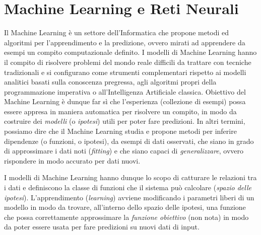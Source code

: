 \section{Machine Learning e Reti Neurali}\label{sec:intro:MLeNN}
Il Machine Learning \cite{Mitchell:ML, Hastie:EOSL} è un settore dell'Informatica che propone metodi ed algoritmi per l'apprendimento e la predizione, ovvero mirati ad apprendere da esempi un compito computazionale definito. I modelli di Machine Learning hanno il compito di risolvere problemi del mondo reale difficili da trattare con tecniche tradizionali e si configurano come strumenti complementari rispetto ai modelli analitici basati sulla conoscenza pregressa, agli algoritmi propri della programmazione imperativa o all'Intelligenza Artificiale classica.
Obiettivo del Machine Learning è dunque far sì che l'esperienza (collezione di esempi) possa essere appresa in maniera automatica per risolvere un compito, in modo da costruire dei \emph{modelli} (o \emph{ipotesi}) utili per poter fare predizioni. In altri termini, possiamo dire che il Machine Learning studia e propone metodi per inferire dipendenze (o funzioni, o ipotesi), da esempi di dati osservati, che siano in grado di approssimare i dati noti (\emph{fitting}) e che siano capaci di \emph{generalizzare}, ovvero rispondere in modo accurato per dati nuovi. 

I modelli di Machine Learning hanno dunque lo scopo di catturare le relazioni tra i dati e definiscono la classe di funzioni che il sistema può calcolare (\emph{spazio delle ipotesi}). L'apprendimento (\emph{learning}) avviene modificando i parametri liberi di un modello in modo da trovare, all'interno dello spazio delle ipotesi, una funzione che possa correttamente approssimare la \emph{funzione obiettivo} (non nota) in modo da poter essere usata per fare predizioni su nuovi dati di input. 

